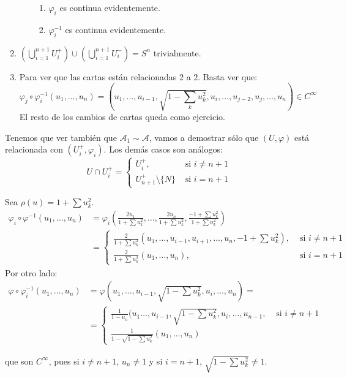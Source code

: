 \documentclass[twoside]{article}
\renewcommand{\A}{{\mathcal{A}}}
\begin{document}
\begin{solucion}
\begin{enumerate}
\begin{enumerate}
\begin{enumerate}
			\item $φ_i$ es continua evidentemente.
			\item $φ_i^{-1}$ es continua evidentemente.
		\end{enumerate}
	\end{enumerate}
	\item $(\bigcup_{i=1}^{n+1} U_i^+) \cup (\bigcup_{i=1}^{n+1} U_i^-) = S^n$ trivialmente.
	\item Para ver que las cartas están relacionadas 2 a 2. Basta ver que:
		\[ φ_j \circ φ_i^{-1} (u_1,\dots,u_n) = (u_1,\dots,u_{i-1},\sqrt{1-\sum_k u_k^2}, u_i,\dots,u_{j-2},u_j,\dots,u_n) \in C^{∞} \]
		El resto de los cambios de cartas queda como ejercicio.
	\end{enumerate}
	Tenemos que ver también que $\A_1 \sim \A$, vamos a demostrar sólo que $(U,φ)$ está relacionada con $(U_i^+,φ_i)$. Los demás casos son análogos:
	\[ U \cap U_i^+ = \begin{cases}
	U_i^+, &\text{ si }i \neq n+1\\
	U_{n+1}^+ \setminus \{N\} &\text{ si }i = n+1
\end{cases}\]

Sea $ρ(u)=1+\sum u_k^2$.
\begin{align*}
	φ_i \circ φ^{-1} (u_1,\dots,u_n) & = φ_i\left(\frac{2u_1}{1+\sum u_k^2}, \dots, \frac{2u_n}{1+\sum u_k^2}, \frac{-1+\sum u_k^2}{1+\sum u_k^2}\right)\\
	& = \begin{cases}
	\frac{2}{1+\sum u_k^2}(u_1, \dots, u_{i-1},u_{i+1},\dots,u_n, -1+\sum u_k^2), &\text{ si }i \neq n+1 \\
	\frac{2}{1+\sum u_k^2}(u_1, \dots,u_n), &\text{ si }i = n+1
\end{cases}
\end{align*}
Por otro lado:
\begin{align*}
	φ \circ φ_i^{-1}(u_1,\dots,u_n) & = φ(u_1,\dots,u_{i-1},\sqrt{1-\sum u_k^2},u_i,\dots,u_n) =\\
	& = \begin{cases}
	\frac{1}{1-u_n}(u_1\dots,u_{i-1},\sqrt{1-\sum u_k^2},u_i,\dots,u_{n-1}, &\text{ si }i \neq n+1\\
	\frac{1}{1-\sqrt{1-\sum u_k^2}}(u_1,\dots,u_n)
\end{cases}
\end{align*}

que son $C^{∞}$, pues si $i \neq n+1$, $u_n \neq 1$ y si $i = n+1$, $\sqrt{1-\sum u_k^2} \neq 1$.

\end{solucion}
\end{document}
